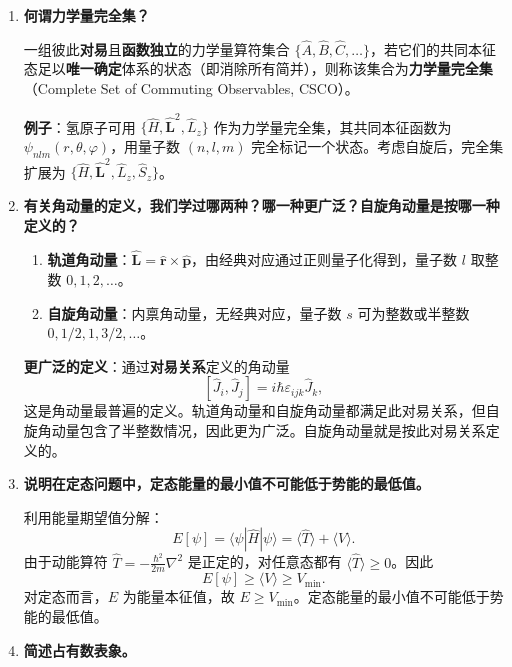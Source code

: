 \begin{enumerate}[label=\textbf{\arabic*.}, leftmargin=2em, itemsep=0.8em, resume]
\item \textbf{何谓力学量完全集？}

一组彼此\textbf{对易}且\textbf{函数独立}的力学量算符集合 $\{\hat{A}, \hat{B}, \hat{C}, \dots\}$，若它们的共同本征态足以\textbf{唯一确定}体系的状态（即消除所有简并），则称该集合为\textbf{力学量完全集}（Complete Set of Commuting Observables, CSCO）。

\textbf{例子}：氢原子可用 $\{\hat{H}, \hat{\mathbf{L}}^2, \hat{L}_z\}$ 作为力学量完全集，其共同本征函数为 $\psi_{nlm}(r,\theta,\varphi)$，用量子数 $(n,l,m)$ 完全标记一个状态。考虑自旋后，完全集扩展为 $\{\hat{H}, \hat{\mathbf{L}}^2, \hat{L}_z, \hat{S}_z\}$。

\item \textbf{有关角动量的定义，我们学过哪两种？哪一种更广泛？自旋角动量是按哪一种定义的？}

\begin{enumerate}[nosep, label=(\arabic*)]
    \item \textbf{轨道角动量}：$\hat{\mathbf{L}} = \hat{\mathbf{r}} \times \hat{\mathbf{p}}$，由经典对应通过正则量子化得到，量子数 $l$ 取整数 $0,1,2,\dots$。
    \item \textbf{自旋角动量}：内禀角动量，无经典对应，量子数 $s$ 可为整数或半整数 $0, 1/2, 1, 3/2, \dots$。
\end{enumerate}

\textbf{更广泛的定义}：通过\textbf{对易关系}定义的角动量
\[
    [\hat{J}_i, \hat{J}_j] = i\hbar\varepsilon_{ijk}\hat{J}_k,
\]
这是角动量最普遍的定义。轨道角动量和自旋角动量都满足此对易关系，但自旋角动量包含了半整数情况，因此更为广泛。自旋角动量就是按此对易关系定义的。

\item \textbf{说明在定态问题中，定态能量的最小值不可能低于势能的最低值。}

利用能量期望值分解：
\[
    E[\psi] = \langle\psi|\hat{H}|\psi\rangle = \langle\hat{T}\rangle + \langle V\rangle.
\]
由于动能算符 $\hat{T} = -\frac{\hbar^2}{2m}\nabla^2$ 是正定的，对任意态都有 $\langle\hat{T}\rangle \ge 0$。因此
\[
    E[\psi] \ge \langle V\rangle \ge V_{\min}.
\]
对定态而言，$E$ 为能量本征值，故 $E \ge V_{\min}$。定态能量的最小值不可能低于势能的最低值。

\item \textbf{简述占有数表象。}


\end{enumerate}
